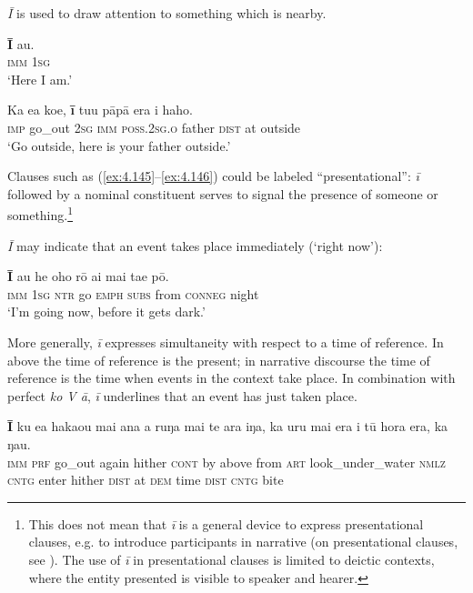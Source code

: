 \textit{{\ꞌ}Ī} is used to draw attention to something which is nearby. 

\ea\label{ex:4.145}
\gll \textbf{{\ꞌ}Ī} au. \\
\textsc{imm} \textsc{1sg} \\

\glt 
‘Here I am.’ \textstyleExampleref{[R363.078]} 
\z

\ea\label{ex:4.146}
\gll Ka e{\ꞌ}a koe, \textbf{{\ꞌ}ī} tu{\ꞌ}u pāpā era {\ꞌ}i haho. \\
\textsc{imp} go\_out \textsc{2sg} \textsc{imm} \textsc{poss.2sg.o} father \textsc{dist} at outside \\

\glt
‘Go outside, here is your father outside.’ \textstyleExampleref{[R210.094]} 
\z

Clauses such as (\ref{ex:4.145}–\ref{ex:4.146}) could be labeled “presentational”: \textit{{\ꞌ}ī} followed by a nominal constituent serves to signal the presence of someone or something.\footnote{\label{fn:201}This does not mean that \textit{{\ꞌ}ī} is a general device to express presentational clauses, e.g. to introduce participants in narrative (on presentational clauses, see \citealt[4]{Bailey2009}). The use of \textit{{\ꞌ}ī} in presentational clauses is limited to deictic contexts, where the entity presented is visible to speaker and hearer.} 

\textit{{\ꞌ}Ī} may indicate that an event takes place immediately (‘right now’): 

\ea\label{ex:4.147}
\gll \textbf{{\ꞌ}Ī} au he oho rō {\ꞌ}ai mai ta{\ꞌ}e pō. \\
\textsc{imm} \textsc{1sg} \textsc{ntr} go \textsc{emph} \textsc{subs} from \textsc{conneg} night \\

\glt
‘I’m going now, before it gets dark.’ \textstyleExampleref{[R153.042]} 
\z

More generally, \textit{{\ꞌ}ī} expresses simultaneity with respect to a time of reference. In  above the time of reference is the present; in narrative discourse the time of reference is the time when events in the context take place. In combination with perfect  \textit{ko V {\ꞌ}ā}, \textit{{\ꞌ}ī} underlines that an event has just taken place.

\ea\label{ex:4.148}
\gll \textbf{{\ꞌ}Ī} ku e{\ꞌ}a haka{\ꞌ}ou mai {\ꞌ}ana a ruŋa mai te {\ꞌ}ara iŋa,   ka uru mai era {\ꞌ}i tū hora era, ka ŋau.\\
\textsc{imm} \textsc{prf} go\_out again hither \textsc{cont} by above from \textsc{art} look\_under\_water \textsc{nmlz}   \textsc{cntg} enter hither \textsc{dist} at \textsc{dem} time \textsc{dist} \textsc{cntg} bite\\

